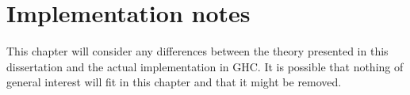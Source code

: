 \chapter{Implementation notes}
\label{cha:implementation}

\begin{proposal}
This chapter will consider any differences between the theory presented
in this dissertation and the actual implementation in GHC. It is possible
that nothing of general interest will fit in this chapter and that it might
be removed.
\end{proposal}
